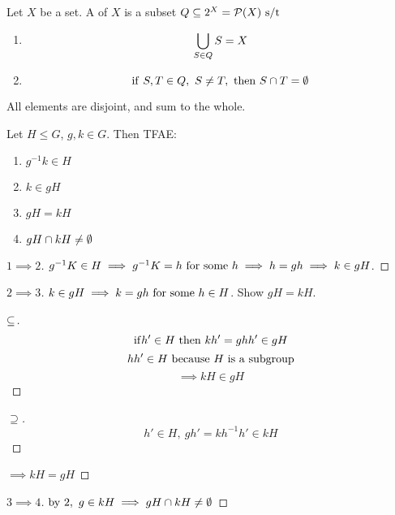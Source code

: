 \documentclass[12pt]{article}
\newcommand\subgroup{\le}
\begin{document}
\bboxdefn
\begin{defn}[Partition]
    Let \(X\) be a set. A  of \(X\) is a
    subset \(Q\subseteq 2^X=\mathcal P(X)\text{ s/t }\)
    \begin{enumerate}
        \item 
            \[
                \bigcup_{S\in Q}S=X
            \]
        \item 
            \[
                \iif\ S,T\in Q,\ S\neq T,\ \tthen\ S\intr T=\emptyset
            \]
    \end{enumerate}
    All elements are disjoint, and sum to the whole.
\end{defn}
\ebox

\bboxprop
\begin{prop}
    Let \(H\subgroup G\), \(g,k\in G\). Then TFAE:
    \begin{enumerate}
        \item \(g^{-1}k\in H\)
        \item \(k\in gH\)
        \item \(gH=kH\)
        \item \(gH\cap kH\neq\emptyset\)
    \end{enumerate}
\end{prop}
\ebox

\bboxproof
\begin{proof}[\(1\implies 2\)]
    \(g^{-1}K\in H\implies g^{-1}K=h\ \TR{for\ some}\ h\implies
    h=gh\implies k\in gH\).
\end{proof}
\ebox

\bboxproof
\begin{proof}[\(2\implies 3\)]
    \(k\in gH \implies k=gh\ \mathrm{for\ some}\ h\in H\).
    Show \(gH=kH\).
    \bboxproof
    \begin{proof}[\(\subseteq\)]
        \[
            \mathrm{if} h' \in H\ \mathrm{then}\ kh' = ghh' \in gH
        \]
        \[
            hh' \in H\ \TR{because}\ H\ \TR{is\ a\ subgroup}
        \]
        \[
            \implies kH\in gH
        \]
    \end{proof}
    \ebox

    \bboxproof
    \begin{proof}[\(\supseteq\)]
        \[
            h'\in H,\ gh'=kh^{-1}h'\in kH
        \]
    \end{proof}
    \ebox
    \(\implies kH=gH\)
\end{proof}
\ebox

\bboxproof
\begin{proof}[\(3\implies 4\)]
    \(\mathrm{by}\ 2,\ g\in kH\implies gH\cap kH\neq\emptyset\)
\end{proof}
\ebox
\end{document}
